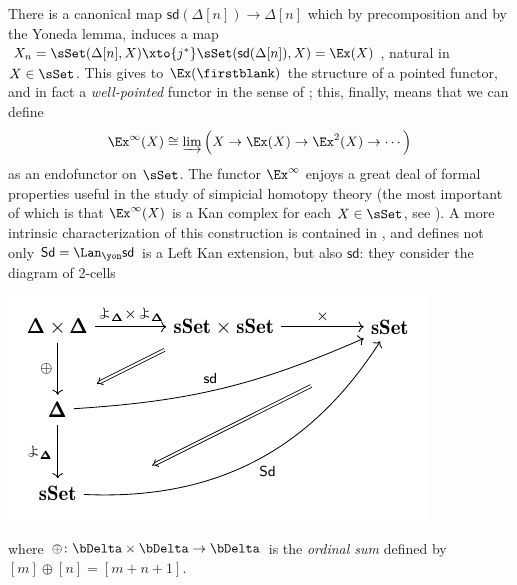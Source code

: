 \begin{example}
There is a canonical map $\textsf{sd}(\Delta[n]) \to \Delta[n]$ which by precomposition and by the Yoneda lemma, induces a map $X_n=\sSet(\Delta[n],X)\xto{j^*} \sSet(\textsf{sd}(\Delta[n]),X)=\Ex(X)$, natural in $X\in\sSet$. This gives to $\Ex(\firstblank)$ the structure of a pointed functor, and in fact a \emph{well\hyp{}pointed} functor in the sense of \cite{kelly1980unified}; this, finally, means that we can define
\[
\Ex^\infty(X) \cong \varinjlim\Big( X \to \Ex(X) \to \Ex^2(X) \to \cdots\Big)
\]
as an endofunctor on $\sSet$. The functor $\Ex^\infty$ enjoys a great deal of formal properties useful in the study of simpicial homotopy theory (the most important of which is that $\Ex^\infty(X)$ is a Kan complex for each $X\in\sSet$, see \cite{GoJ}). A more intrinsic characterization of this construction is contained in \cite{ehlers2008ordinal}, and defines not only $\textsf{Sd} = \Lan_\yon\textsf{sd}$ is a Left Kan extension, but also $\textsf{sd}$: they consider the diagram of 2-cells
\begin{center}
\includegraphics[scale=1]{figures/fig3}
\end{center}
where $\oplus \colon \bDelta\times\bDelta\to \bDelta$ is the \emph{ordinal sum} defined by $[m]\oplus[n] = [m+n+1]$.
\end{example}
